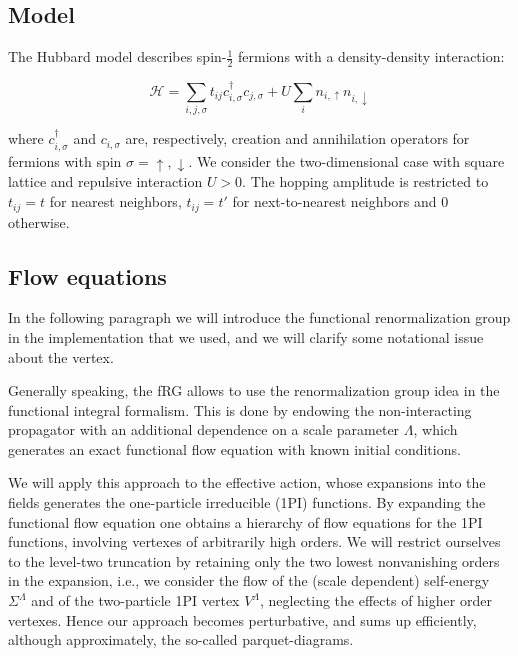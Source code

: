 
\subsection{Model}

The Hubbard model describes spin-$\frac{1}{2}$ fermions with a density-density interaction:

\begin{equation}
\mathcal{H} = \sum_{i,j,\sigma} t_{ij} c^{\dagger}_{i,\sigma} c_{j,\sigma} + U \sum_{i} n_{i,\uparrow} n_{i,\downarrow}
\end{equation}

where $c^{\dagger}_{i,\sigma}$ and $c_{i,\sigma}$ are, respectively, creation and annihilation operators 
for fermions with spin $\sigma=\uparrow,\downarrow$. We consider the two-dimensional case with square lattice and repulsive interaction $U>0$. The hopping amplitude is restricted to $t_{ij} = t$ for nearest neighbors, $t_{ij}=t'$ for next-to-nearest neighbors and $0$ otherwise.




\subsection{Flow equations}


In the following paragraph we will introduce the functional renormalization group in the implementation that we used, and we will clarify some notational issue about the vertex. 

Generally speaking, the fRG allows to use the renormalization group idea in the functional integral formalism. 
This is done by endowing the non-interacting propagator with an additional dependence on a scale parameter $\Lambda$, which generates an exact functional flow equation with known initial conditions. 

We will apply this approach to the effective action, whose expansions into the fields generates the one-particle irreducible (1PI)  functions. By expanding the functional flow equation one obtains a hierarchy of flow equations for the 1PI functions, involving vertexes of arbitrarily  high orders. 
We will restrict ourselves to the level-two truncation by retaining only the two lowest nonvanishing orders in the expansion, i.e., we consider the flow of the (scale dependent) self-energy $\Sigma^\Lambda$ and of the two-particle 1PI vertex $V^\Lambda$, neglecting the effects of higher order vertexes. 
Hence our approach becomes perturbative, and sums up efficiently, although approximately, the so-called parquet-diagrams. 

